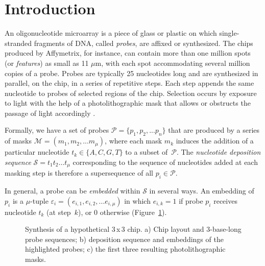 \documentclass{bioinfo}
\begin{document}
\section{Introduction}

An oligonucleotide microarray is a piece of glass or plastic on which single-stranded fragments of DNA, called \emph{probes}, are affixed or synthesized. The chips produced by Affymetrix, for instance, can contain more than one million spots (or \emph{features}) as small as 11 $\mu$m, with each spot accommodating several million copies of a probe. Probes are typically 25 nucleotides long and are synthesized in parallel, on the chip, in a series of repetitive steps. Each step appends the same nucleotide to probes of selected regions of the chip. Selection occurs by exposure to light with the help of a photolithographic mask that allows or obstructs the passage of light accordingly \citep{FODOR91}.

Formally, we have a set of probes $\mathcal{P} = \{p_{1}, p_{2}, ... p_{n}\}$ that are produced by a series of masks $\mathcal{M} = (m_{1}, m_{2}, ... m_{\mu})$, where each mask $m_{k}$ induces the addition of a particular nucleotide $t_{k} \in \{A, C, G, T\}$ to a subset of~$\mathcal{P}$. The \emph{nucleotide deposition sequence} $\mathcal{S} = t_{1} t_{2} \ldots t_{\mu}$ corresponding to the sequence of nucleotides added at each masking step is therefore a supersequence of all $p_{i} \in \mathcal{P}$.

In general, a probe can be \emph{embedded} within $\mathcal{S}$ in several ways. An embedding of $p_{i}$ is a $\mu$-tuple $\varepsilon_{i} = (e_{i,1}, e_{i,2}, ... e_{i,\mu})$ in which $e_{i,k} = 1$ if probe $p_{i}$ receives nucleotide $t_{k}$ (at step~$k$), or 0 otherwise (Figure~\ref{fig:masking_process}).

\begin{figure}
\caption{Synthesis of a hypothetical 3\,x\,3 chip. a) Chip layout and 3-base-long probe sequences; b) deposition sequence and embeddings of the highlighted probes; c) the first three resulting photolithographic masks.}
\label{fig:masking_process}
\end{figure}
\end{document}
